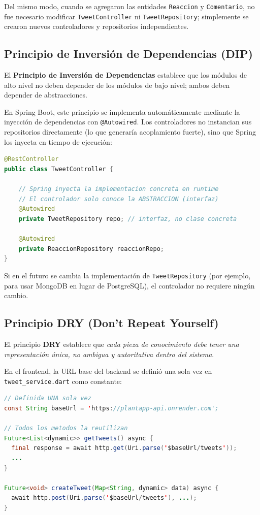 \documentclass[12pt,a4paper]{article}
\begin{document}
Del mismo modo, cuando se agregaron las entidades \texttt{Reaccion} y \texttt{Comentario}, no fue necesario modificar \texttt{TweetController} ni \texttt{TweetRepository}; simplemente se crearon nuevos controladores y repositorios independientes.

\subsection{Principio de Inversión de Dependencias (DIP)}

El \textbf{Principio de Inversión de Dependencias} establece que los módulos de alto nivel no deben depender de los módulos de bajo nivel; ambos deben depender de abstracciones.

En Spring Boot, este principio se implementa automáticamente mediante la inyección de dependencias con \texttt{@Autowired}. Los controladores no instancian sus repositorios directamente (lo que generaría acoplamiento fuerte), sino que Spring los inyecta en tiempo de ejecución:

\begin{lstlisting}[style=javastyle, language=Java, caption=Inversión de dependencias mediante @Autowired]
@RestController
public class TweetController {

    // Spring inyecta la implementacion concreta en runtime
    // El controlador solo conoce la ABSTRACCION (interfaz)
    @Autowired
    private TweetRepository repo; // interfaz, no clase concreta

    @Autowired
    private ReaccionRepository reaccionRepo;
}
\end{lstlisting}

Si en el futuro se cambia la implementación de \texttt{TweetRepository} (por ejemplo, para usar MongoDB en lugar de PostgreSQL), el controlador no requiere ningún cambio.

\subsection{Principio DRY (Don't Repeat Yourself)}

El principio \textbf{DRY} establece que \textit{cada pieza de conocimiento debe tener una representación única, no ambigua y autoritativa dentro del sistema}.

En el frontend, la URL base del backend se definió una sola vez en \texttt{tweet\_service.dart} como constante:

\begin{lstlisting}[style=dartstyle, language=Java, caption=Constante central que evita repetición]
// Definida UNA sola vez
const String baseUrl = 'https://plantapp-api.onrender.com';

// Todos los metodos la reutilizan
Future<List<dynamic>> getTweets() async {
  final response = await http.get(Uri.parse('$baseUrl/tweets'));
  ...
}

Future<void> createTweet(Map<String, dynamic> data) async {
  await http.post(Uri.parse('$baseUrl/tweets'), ...);
}
\end{lstlisting}
\end{document}
